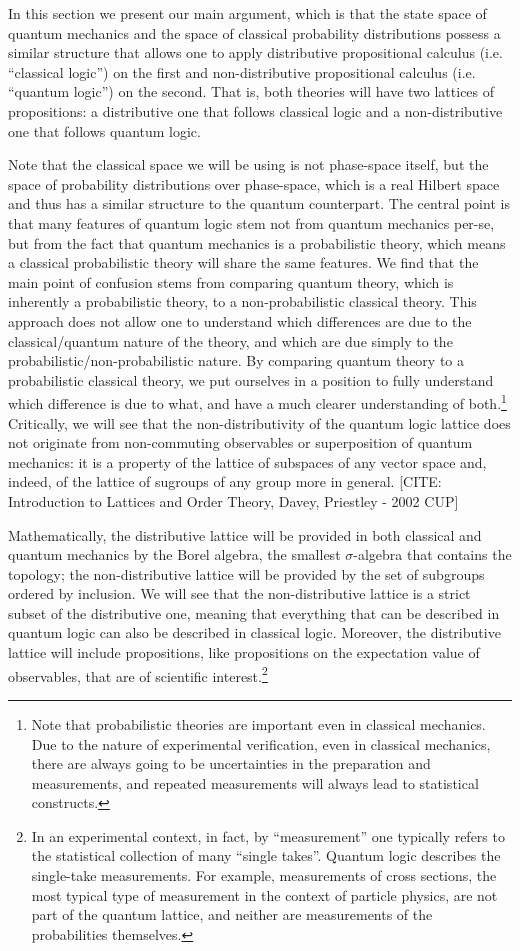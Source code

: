 \documentclass[11pt, executivepaper]{article}
\begin{document}
In this section we present our main argument, which is that the state space of quantum mechanics and the space of classical probability distributions possess a similar structure that allows one to apply distributive propositional calculus (i.e. ``classical logic'') on the first and non-distributive propositional calculus (i.e. ``quantum logic'') on the second. That is, both theories will have two lattices of propositions: a distributive one that follows classical logic and a non-distributive one that follows quantum logic.

Note that the classical space we will be using is not phase-space itself, but the space of probability distributions over phase-space, which is a real Hilbert space and thus has a similar structure to the quantum counterpart. The central point is that many features of quantum logic stem not from quantum mechanics per-se, but from the fact that quantum mechanics is a probabilistic theory, which means a classical probabilistic theory will share the same features. We find that the main point of confusion stems from comparing quantum theory, which is inherently a probabilistic theory, to a non-probabilistic classical theory. This approach does not allow one to understand which differences are due to the classical/quantum nature of the theory, and which are due simply to the probabilistic/non-probabilistic nature. By comparing quantum theory to a probabilistic classical theory, we put ourselves in a position to fully understand which difference is due to what, and have a much clearer understanding of both.\footnote{Note that probabilistic theories are important even in classical mechanics. Due to the nature of experimental verification, even in classical mechanics, there are always going to be uncertainties in the preparation and measurements, and repeated measurements will always lead to statistical constructs.} Critically, we will see that the non-distributivity of the quantum logic lattice does not originate from non-commuting observables or superposition of quantum mechanics: it is a property of the lattice of subspaces of any vector space and, indeed, of the lattice of sugroups of any group more in general. [CITE: Introduction to Lattices and Order Theory, Davey, Priestley - 2002 CUP]

Mathematically, the distributive lattice will be provided in both classical and quantum mechanics by the Borel algebra, the smallest $\sigma$-algebra that contains the topology; the non-distributive lattice will be provided by the set of subgroups ordered by inclusion. We will see that the non-distributive lattice is a strict subset of the distributive one, meaning that everything that can be described in quantum logic can also be described in classical logic. Moreover, the distributive lattice will include propositions, like propositions on the expectation value of observables, that are of scientific interest.\footnote{In an experimental context, in fact, by ``measurement'' one typically refers to the statistical collection of many ``single takes''. Quantum logic describes the single-take measurements. For example, measurements of cross sections, the most typical type of measurement in the context of particle physics, are not part of the quantum lattice, and neither are measurements of the probabilities themselves.}
\end{document}
